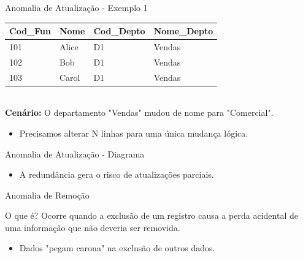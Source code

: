 \documentclass[9pt]{beamer}
\begin{document}
\begin{frame}{Anomalia de Atualização - Exemplo 1}
  \begin{tabular}{|l|l|l|l|}
    \hline
    \textbf{Cod\_Fun} & \textbf{Nome} & \textbf{Cod\_Depto} & \textbf{Nome\_Depto} \\ \hline
    101 & Alice & D1 & \color{red}Vendas \\ \hline
    102 & Bob & D1 & \color{red}Vendas \\ \hline
    103 & Carol & D1 & \color{red}Vendas \\ \hline
  \end{tabular}
  \vspace{0.3cm}\\ 
  \textbf{Cenário:} O departamento "Vendas" mudou de nome para "Comercial".
  \begin{itemize}
    \item Precisamos alterar N linhas para uma única mudança lógica.
  \end{itemize}
\end{frame}

\begin{frame}{Anomalia de Atualização - Diagrama}
  \centering
  \vspace{0.3cm}
  \begin{itemize}
      \item A redundância gera o risco de atualizações parciais.
  \end{itemize}
\end{frame}

\begin{frame}{Anomalia de Remoção}
  \begin{block}{O que é?}
    Ocorre quando a exclusão de um registro causa a perda acidental de uma informação que não deveria ser removida.
  \end{block}
  \begin{itemize}
    \item Dados "pegam carona" na exclusão de outros dados.
  \end{itemize}
\end{frame}
\end{document}
